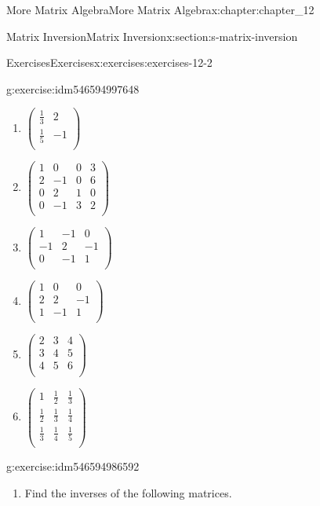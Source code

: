 \documentclass[oneside,10pt,]{book}
\numberwithin{equation}{section}
\begin{document}
\begin{chapterptx}{More Matrix Algebra}{}{More Matrix Algebra}{}{}{x:chapter:chapter_12}
\begin{sectionptx}{Matrix Inversion}{}{Matrix Inversion}{}{}{x:section:s-matrix-inversion}
\begin{exercises-subsection}{Exercises}{}{Exercises}{}{}{x:exercises:exercises-12-2}
\begin{divisionexercise}{3}{}{}{g:exercise:idm546594997648}
\begin{enumerate}[label=(\alph*)]
\item{}\(\left(
\begin{array}{cc}
\frac{1}{3} & 2 \\
\frac{1}{5} & -1 \\
\end{array}
\right)\)%
\item{}\(\left(
\begin{array}{cccc}
1 & 0 & 0 & 3 \\
2 & -1 & 0 & 6 \\
0 & 2 & 1 & 0 \\
0 & -1 & 3 & 2 \\
\end{array}
\right)\)%
\item{}\(\left(
\begin{array}{ccc}
1 & -1 & 0 \\
-1 & 2 & -1 \\
0 & -1 & 1 \\
\end{array}
\right)\)%
\item{}\(\left(
\begin{array}{ccc}
1 & 0 & 0 \\
2 & 2 & -1 \\
1 & -1 & 1 \\
\end{array}
\right)\)%
\item{}\(\left(
\begin{array}{ccc}
2 & 3 & 4 \\
3 & 4 & 5 \\
4 & 5 & 6 \\
\end{array}
\right)\)%
\item{}\(\left(
\begin{array}{ccc}
1 & \frac{1}{2} & \frac{1}{3} \\
\frac{1}{2} & \frac{1}{3} & \frac{1}{4} \\
\frac{1}{3} & \frac{1}{4} & \frac{1}{5} \\
\end{array}
\right)\)%
\end{enumerate}
%
\end{divisionexercise}%
\begin{divisionexercise}{4}{}{}{g:exercise:idm546594986592}%
%
\begin{enumerate}[label=(\alph*)]
\item{}Find the inverses of the following matrices.%

\end{enumerate}
\end{divisionexercise}
\end{exercises-subsection}
\end{sectionptx}
\end{chapterptx}
\end{document}
